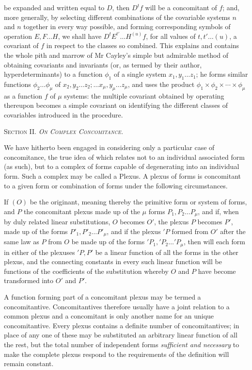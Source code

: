 \documentclass[11pt]{article}
\newcommand{\sourcepage}[1]{\marginpar{\scriptsize p.~#1}}
\begin{document}
{{\sourcepage{291}
be expanded and written equal to $D$, then $D^tf$ will be a concomitant of $f$; and, more generally, by selecting different combinations of the covariable systems $n$ and $n$ together in every way possible, and forming corresponding symbols of operation $E,F\ldots H$, we shall have $D^tE^{t'}\ldots H^{(u)}f$, for all values of $t,t'\ldots(u)$, a covariant of $f$ in respect to the classes so combined. This explains and contains the whole pith and marrow of Mr Cayley's simple but admirable method of obtaining covariants and invariants (or, as termed by their author, hyperdeterminants) to a function $\phi_1$ of a single system $x_1,y_1\ldots z_1$; he forms similar functions $\phi_2\ldots\phi_\mu$ of $x_2,y_2\ldots z_2;\ldots x_\mu,y_\mu\ldots z_\mu$, and uses the product $\phi_1\times\phi_2\times\cdots\times\phi_\mu$ as a function $f$ of $\mu$ systems: the multiple covariant obtained by operating thereupon becomes a simple covariant on identifying the different classes of covariables introduced in the procedure.

\begin{center}
{\scshape Section II. \emph{On Complex Concomitance.}}
\end{center}

We have hitherto been engaged in considering only a particular case of concomitance, the true idea of which relates not to an individual associated form (as such), but to a complex of forms capable of degenerating into an individual form. Such a complex may be called a Plexus. A plexus of forms is concomitant to a given form or combination of forms under the following circumstances.

If $(O)$ be the originant, meaning thereby the primitive form or system of forms, and $P$ the concomitant plexus made up of the $\mu$ forms $P_1,P_2\ldots P_\mu$, and if, when by duly related linear substitutions, $O$ becomes $O'$, the plexus $P$ becomes $P'$, made up of the forms $P'_1,P'_2\ldots P'_\mu$, and if the plexus $'P$ formed from $O'$ after the same law as $P$ from $O$ be made up of the forms $'P_1,'P_2\ldots 'P_\mu$, then will each form in either of the plexuses $'P,P'$ be a linear function of all the forms in the other plexus, and the connecting constants in every such linear function will be functions of the coefficients of the substitution whereby $O$ and $P$ have become transformed into $O'$ and $P'$.

A function forming part of a concomitant plexus may be termed a concomitantive. Concomitantives therefore usually have a joint relation to a common plexus and a concomitant is only another name for an unique concomitantive. Every plexus contains a definite number of concomitantives; in place of any one of these may be substituted an arbitrary linear function of all the rest, but the total number of independent forms \emph{sufficient and necessary} to make the complete plexus respond to the requirements of the definition will remain constant.

}}
\end{document}
